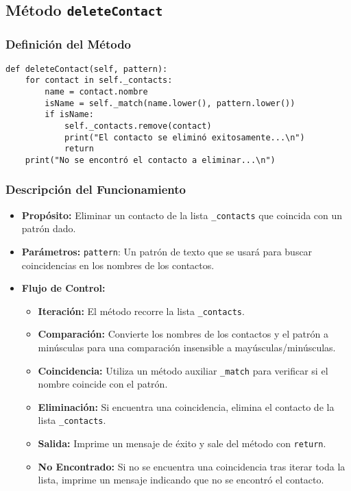 \subsection{Método \texttt{deleteContact}}
\subsubsection{Definición del Método}

\begin{verbatim}
def deleteContact(self, pattern):
    for contact in self._contacts:
        name = contact.nombre
        isName = self._match(name.lower(), pattern.lower())
        if isName:
            self._contacts.remove(contact)
            print("El contacto se eliminó exitosamente...\n")
            return
    print("No se encontró el contacto a eliminar...\n")
\end{verbatim}

\subsubsection{Descripción del Funcionamiento}
\begin{itemize}
    \item \textbf{Propósito:}
    Eliminar un contacto de la lista \texttt{\_contacts} que coincida con un patrón dado.
    \item \textbf{Parámetros:}
    \texttt{pattern}: Un patrón de texto que se usará para buscar coincidencias en los nombres de los contactos.
    \item \textbf{Flujo de Control:}
    \begin{itemize}
        \item \textbf{Iteración:} El método recorre la lista \texttt{\_contacts}.
        \item \textbf{Comparación:} Convierte los nombres de los contactos y el patrón a minúsculas para una comparación insensible a mayúsculas/minúsculas.
        \item \textbf{Coincidencia:} Utiliza un método auxiliar \texttt{\_match} para verificar si el nombre coincide con el patrón.
        \item \textbf{Eliminación:} Si encuentra una coincidencia, elimina el contacto de la lista \texttt{\_contacts}.
        \item \textbf{Salida:} Imprime un mensaje de éxito y sale del método con \texttt{return}.
        \item \textbf{No Encontrado:} Si no se encuentra una coincidencia tras iterar toda la lista, imprime un mensaje indicando que no se encontró el contacto.
    \end{itemize}
\end{itemize}

